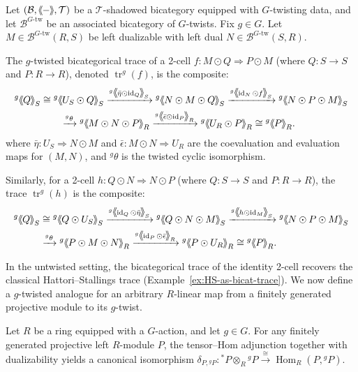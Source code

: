 \documentclass[11pt,oneside]{amsart}
\DeclareMathOperator{\Hom}{Hom}
\DeclareMathOperator{\id}{id}
\numberwithin{equation}{section}
\numberwithin{figure}{section}
\theoremstyle{plain}
\theoremstyle{definition}
\theoremstyle{remark}
\newcommand{\shspace}{\hspace{.5mm}} %
\newcommand{\sh}[1]{{\ensuremath{\shspace\hspace{1mm}\makebox[-1mm]{$\langle$}\makebox[0mm]{$\langle$}\hspace{1mm}{#1}\makebox[1mm]{$\rangle$}\makebox[0mm]{$\rangle$}\shspace}}}
\begin{document}
\begin{definition}\label{def:twisted-bicat-trace}
Let $(\mathcal{B}, \sh{-}, \mathcal{T})$ be a $\mathcal{T}$-shadowed bicategory equipped with $G$-twisting data, and let $\mathcal{B}^{G\text{-tw}}$ be an associated bicategory of $G$-twists. Fix \(g\in G\). Let
\(M\in \mathcal B^{G\text{-tw}}(R,S)\) be left dualizable with left dual
\(N\in \mathcal B^{G\text{-tw}}(S,R)\).

The $g$-twisted bicategorical trace of a 2-cell 
$f : M \odot Q \Rightarrow P \odot M$ (where $Q: S \to S$ and $P: R \to R$), denoted $\operatorname{tr}^g(f)$, is the composite:
\[
\begin{aligned}
{}^g\sh{Q}_S 
&\cong {}^g\sh{U_S\odot Q}_S 
\xrightarrow{{}^g\sh{\bar{\eta}\odot \id_Q}_S} 
{}^g\sh{N\odot M\odot Q}_S 
\xrightarrow{{}^g\sh{\id_N\odot f}_S} 
{}^g\sh{N\odot P\odot M}_S \\
&\qquad \xrightarrow{{}^g\theta} 
{}^g\sh{M\odot N\odot P}_R 
\xrightarrow{{}^g\sh{\bar{\epsilon}\odot \id_P}_R} 
{}^g\sh{U_R\odot P}_R 
\cong {}^g\sh{P}_R .
\end{aligned}
\]
where $\bar{\eta}: U_S \Rightarrow N \odot M$ and $\bar{\epsilon}: M \odot N \Rightarrow U_R$ are the coevaluation and evaluation maps for $(M,N)$, and ${}^g\theta$ is the twisted cyclic isomorphism.

Similarly, for a 2-cell $h : Q \odot N \Rightarrow N \odot P$ (where $Q: S \to S$ and $P: R \to R$), the trace $\operatorname{tr}^g(h)$ is the composite:
\[
\begin{aligned}
{}^g\sh{Q}_S
&\cong {}^g\sh{Q\odot U_S}_S
\xrightarrow{{}^g\sh{\id_Q\odot \bar{\eta}}_S}
{}^g\sh{Q\odot N\odot M}_S
\xrightarrow{{}^g\sh{h\odot \id_M}_S}
{}^g\sh{N\odot P\odot M}_S \\
&\xrightarrow{{}^g\theta}
{}^g\sh{P\odot M\odot N}_R
\xrightarrow{{}^g\sh{\id_P\odot \bar{\epsilon}}_R}
{}^g\sh{P\odot U_R}_R
\cong {}^g\sh{P}_R .
\end{aligned}
\]
\end{definition}

 
 

In the untwisted setting, the bicategorical trace of the identity 
2-cell recovers the classical Hattori--Stallings trace (Example~\ref{ex:HS-as-bicat-trace}). We now define a
$g$-twisted analogue for an arbitrary
$R$-linear map from a finitely generated
projective module to its 
$g$-twist.

Let $R$ be a ring equipped with a $G$-action, and let $g \in G$. For any finitely generated projective left $R$-module $P$, the tensor--Hom adjunction together with dualizability yields a canonical isomorphism
$
\delta_{P,{}^{g}P}: {}^*P\otimes_R {}^{g}P \xrightarrow{\cong} \Hom_R(P,{}^{g}P).
$
\end{document}
